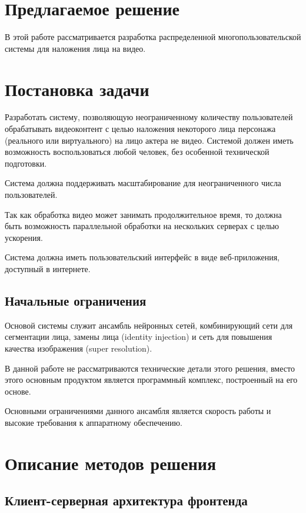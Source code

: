 \section{Предлагаемое решение}

В этой работе рассматривается разработка распределенной многопользовательской системы для наложения лица на видео.

\section{Постановка задачи}

Разработать систему, позволяющую неограниченному количеству пользователей обрабатывать видеоконтент с целью наложения некоторого лица персонажа (реального или виртуального) на лицо актера не видео. Системой должен иметь возможность воспользоваться любой человек, без особенной технической подготовки.

Система должна поддерживать масштабирование для неограниченного числа пользователей.

Так как обработка видео может занимать продолжительное время, то должна быть возможность параллельной обработки на нескольких серверах с целью ускорения.

Система должна иметь пользовательский интерфейс в виде веб-приложения, доступный в интернете.

\subsection{Начальные ограничения}

Основой системы служит ансамбль нейронных сетей, комбинирующий сети для сегментации лица, замены лица (identity injection) и сеть для повышения качества изображения (super resolution).

В данной работе не рассматриваются технические детали этого решения, вместо этого основным продуктом является программный комплекс, построенный на его основе.

Основными ограничениями данного ансамбля является скорость работы и высокие требования к аппаратному обеспечению.

\section{Описание методов решения}

\subsection{Клиент-серверная архитектура фронтенда}

